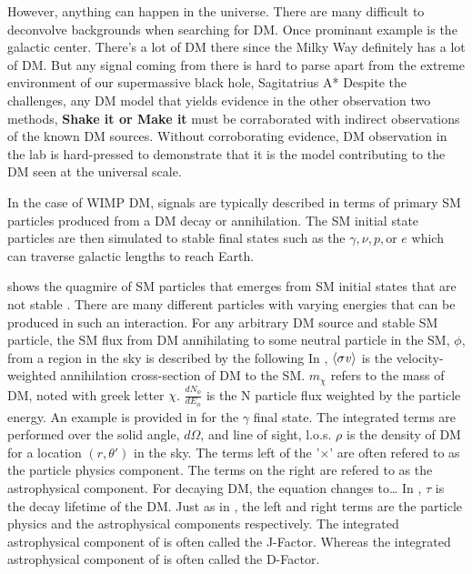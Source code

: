 However, anything can happen in the universe.
There are many difficult to deconvolve backgrounds when searching for DM.
Once prominant example is the galactic center.
There's a lot of DM there since the Milky Way definitely has a lot of DM.
But any signal coming from there is hard to parse apart from the extreme environment of our supermassive black hole, Sagitatrius A* \cite{Tracy:les_houches}
Despite the challenges, any DM model that yields evidence in the other observation two methods, \textbf{Shake it or Make it} must be corraborated with indirect observations of the known DM sources.
Without corroborating evidence, DM observation in the lab is hard-pressed to demonstrate that it is the model contributing to the DM seen at the universal scale.

In the case of WIMP DM, signals are typically described in terms of primary SM particles produced from a DM decay or annihilation.
The SM initial state particles are then simulated to stable final states such as the $\gamma, \nu, p, \text{or } e$ which can traverse galactic lengths to reach Earth.

 shows the quagmire of SM particles that emerges from SM initial states that are not stable \cite{2021ICRC:glory_duck}.
There are many different particles with varying energies that can be produced in such an interaction.
For any arbitrary DM source and stable SM particle, the SM flux from DM annihilating to some neutral particle in the SM, $\phi$, from a region in the sky is described by the following
\iddmannilation
In , $\langle \sigma \mathit{v} \rangle$ is the velocity-weighted annihilation cross-section of DM to the SM.
$m_\chi$ refers to the mass of DM, noted with greek letter $\chi$.
$\frac{dN_{\phi}}{dE_\phi}$ is the N particle flux weighted by the particle energy.
An example is provided in  for the $\gamma$ final state.
The integrated terms are performed over the solid angle, $d\Omega$, and line of sight, l.o.s.
$\rho$ is the density of DM for a location $(r, \theta')$ in the sky.
The terms left of the '$\times$' are often refered to as the particle physics component.
The terms on the right are refered to as the astrophysical component.
For decaying DM, the equation changes to\dots
\iddmdecay
In , $\tau$ is the decay lifetime of the DM.
Just as in , the left and right terms are the particle physics and the astrophysical components respectively.
The integrated astrophysical component of  is often called the J-Factor.
Whereas the integrated astrophysical component of  is often called the D-Factor.

